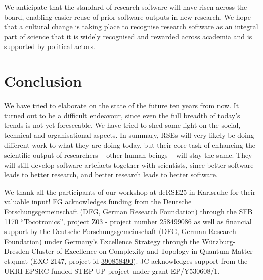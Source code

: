 \documentclass{eceasst}
\newcommand{\geprislink}[1]{\href{https://gepris.dfg.de/gepris/projekt/#1?language=en}{#1}}
\begin{document}
We anticipate that the standard of research software will have risen across the board,
enabling easier reuse of prior software outputs in new research.
We hope that a cultural change is taking place to recognise research software
as an integral part of science that it is widely recognised and rewarded across
academia and is supported by political actors.

\section{Conclusion}
We have tried to elaborate on the state of the future ten years from now.
It turned out to be a difficult endeavour, since even the full breadth of today's trends is not yet foreseeable.
We have tried to shed some light on the social, technical and organisational aspects.
In summary, RSEs will very likely be doing different work to what they are doing today,
but their core task of enhancing the scientific output of researchers -- other human
beings -- will stay the same.
They will still develop software artefacts together with scientists,
since better software leads to better research,
and better research leads to better software.

\begin{acknowledge}
We thank all the participants of our workshop at deRSE25 in Karlsruhe for their valuable input!
FG acknowledges funding from the Deutsche Forschungsgemeinschaft (DFG, German Research Foundation) through the SFB 1170 “Tocotronics”, project Z03 - project number \geprislink{258499086}
as well as financial support by the Deutsche Forschungsgemeinschaft (DFG, German Research
Foundation) under Germany’s Excellence Strategy through the Würzburg-Dresden Cluster of Excellence on Complexity and Topology in Quantum Matter – ct.qmat (EXC 2147, project-id \geprislink{390858490}).
JC acknowledges support from the UKRI-EPSRC-funded STEP-UP project under grant EP/Y530608/1.
\end{acknowledge}



\end{document}
